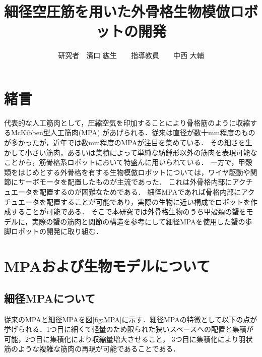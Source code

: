 \documentclass{jarticle}
\begin{document}

\title{
細径空圧筋を用いた外骨格生物模倣ロボットの開発
}
\author{
研究者　濱口 紘生　　指導教員　　中西 大輔
}

\maketitle

\thispagestyle{empty}  %

\section{緒言}

代表的な人工筋肉として，圧縮空気を印加することにより骨格筋のように収縮するMcKibben型人工筋肉(MPA)
があげられる．従来は直径が数十mm程度のものが多かったが，近年では数mm程度のMPAが注目を集めている\cite{wakimoto}．
その細さを生かして小さい筋肉，あるいは集積によって単純な紡錘形以外の筋肉を表現可能なことから，筋骨格系ロボットにおいて特盛んに用いられている\cite{wakimoto}．
一方で，甲殻類をはじめとする外骨格を有する生物模倣ロボットについては，ワイヤ駆動や関節にサーボモータを配置したものが主流であった\cite{crabrobot}．
これは外骨格内部にアクチュエータを配置するのが困難なためである．
細径MPAであれば骨格内部にアクチュエータを配置することが可能であり，実際の生物に近い構成でロボットを作成することが可能である．
そこで本研究では外骨格生物のうち甲殻類の蟹をモデルに，実際の蟹の筋肉と関節の構造を参考にして細径MPAを使用した蟹の歩脚ロボットの開発に取り組む．

\vspace*{-2mm}
\section{MPAおよび生物モデルについて}

\vspace*{-1mm}
\subsection{細径MPAについて}

従来のMPAと細径MPAを図\ref{fig:MPA}に示す．細径MPAの特徴として以下の点が挙げられる．1つ目に細くて軽量のため限られた狭いスペースへの配置と集積が可能，2つ目に集積化により収縮量増大させること，
3つ目に集積化により羽状筋のような複雑な筋肉の再現が可能であることである．
\end{document}

